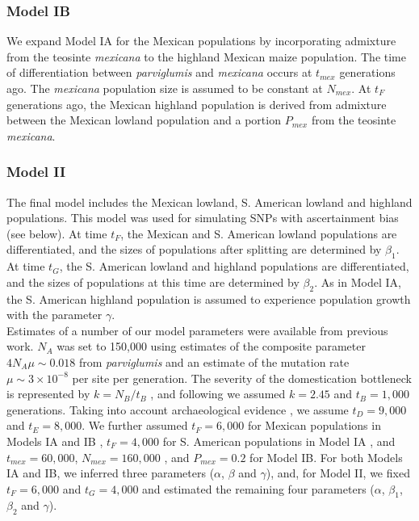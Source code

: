 \subsubsection{Model IB}
We expand Model IA for the Mexican populations by incorporating admixture from the teosinte \emph{mexicana} to the highland Mexican maize population.  
The time of differentiation between \emph{parviglumis} and \emph{mexicana} occurs at $t_{mex}$ generations ago.  
The \emph{mexicana} population size is assumed to be constant at $N_{mex}$.  
At $t_F$ generations ago, the Mexican highland population is derived from admixture between the Mexican lowland population and a portion $P_{mex}$ from the teosinte \emph{mexicana}.\\  

\subsubsection{Model II}
The final model includes the Mexican lowland, S. American lowland and highland populations.  
This model was used for simulating SNPs with ascertainment bias (see below).  
At time $t_F$, the Mexican and S. American lowland populations are differentiated, and the sizes of populations after splitting are determined by $\beta_1$.  
At time $t_G$, the S. American lowland and highland populations are differentiated, and the sizes of populations at this time are determined by $\beta_2$.  
As in Model IA, the S. American highland population is assumed to experience population growth with the parameter $\gamma$.\\

Estimates of a number of our model parameters were available from previous work.    
$N_A$ was set to 150,000 using estimates of the composite parameter $4N_A\mu \sim 0.018$ from \emph{parviglumis}  \cite[]{Eyre-Walker_1998_9539756,Tenaillon_2001_11470895,Tenaillon_2004_15014173,Wright_2005_15919994,Ross-Ibarra_2009_19153259} and an estimate of the mutation rate $\mu \sim 3\times 10^{-8}$ \cite[]{Clark_2005_16079248} per site per generation.  
The severity of the domestication bottleneck is represented by $k=N_B/t_B$ \cite[]{Eyre-Walker_1998_9539756,Wright_2005_15919994}, and following \cite{Wright_2005_15919994} we assumed $k=2.45$ and $t_B=1,000$ generations.  
Taking into account archaeological evidence \cite[]{Piperno_2009_19307570}, we assume $t_D=9,000$ and $t_E=8,000$.  
We further assumed $t_F=6,000$ for Mexican populations in Models IA and IB \cite[]{Piperno_2006_69}, $t_F=4,000$ for S. American populations in Model IA \cite[]{Perry_2006_16511492,Grobman_2012_22307642}, and $t_{mex}=60,000$, $N_{mex}=160,000$ \cite[]{Ross-Ibarra_2009_19153259}, and $P_{mex}=0.2$ \cite[]{vanHeerwaarden_2011_21189301} for Model IB. 
For both Models IA and IB, we inferred three parameters ($\alpha$, $\beta$ and $\gamma$), and, for Model II, we fixed $t_F=6,000$ and $t_G=4,000$ \cite[]{Piperno_2006_69,Perry_2006_16511492,Grobman_2012_22307642}  and estimated the remaining four parameters ($\alpha$, $\beta_1$, $\beta_2$ and $\gamma$).


